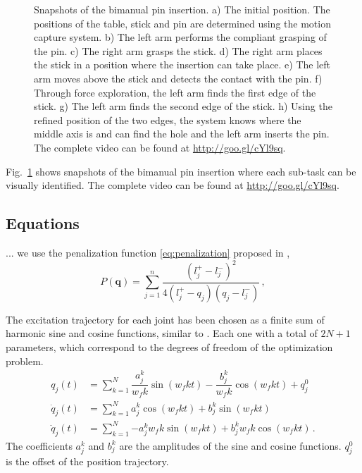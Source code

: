 \documentclass[letterpaper, 10 pt, conference]{ieeeconf}
\newcommand{\fref}[1]{Fig.~\ref{#1}}
\newcommand\vect[1]{\boldsymbol{#1}}
\begin{document}
\begin{figure}[t]
  \caption{Snapshots of the bimanual pin insertion. a) The initial position. The positions of the table, stick and pin are determined using the motion capture system. b) The left arm performs the compliant grasping of the pin. c) The right arm grasps the stick. d) The right arm places the stick in a position where the insertion can take place. e) The left arm moves above the stick and detects the contact with the pin. f) Through force exploration, the left arm finds the first edge of the stick. g) The left arm finds the second edge of the stick. h) Using the refined position of the two edges, the system knows where the middle axis is and can find the hole and the left arm inserts the pin. The complete video can be found at \protect\url{http://goo.gl/cYl9sq}.}
  \label{fig:snapshots}
\end{figure}
\fref{fig:snapshots} shows snapshots of the bimanual pin insertion where each sub-task can be visually identified. The complete video can be found at \url{http://goo.gl/cYl9sq}.

\subsection{Equations}

... we use the penalization function \eqref{eq:penalization} proposed in \cite{Dubey1995},
\begin{equation}
  P(\vect{q}) = \sum_{j=1}^{n}\dfrac{\left( l_{j}^{+} - l_{j}^{-} \right)^{2}}{4 \left( l_{j}^{+} - q_{j} \right)\left( q_{j} - l_{j}^{-} \right)} \, ,
  \label{eq:penalization} 
\end{equation}

The excitation trajectory for each joint has been chosen as a finite sum of harmonic sine and cosine functions, similar to \cite{Swevers2007,Kubus2008}. Each one with a total of $2N + 1$ parameters, which correspond to the degrees of freedom of the optimization problem.
\begin{align}
  q_{j}\left(t\right) &= \sum_{k=1}^{N}{\dfrac{a_{j}^{k}}{w_{f}k}\sin\left( w_{f}kt \right) - \dfrac{b_{j}^{k}}{{w_{f}k}}\cos\left( w_{f}kt \right)} + q_{j}^{0} \\
  \dot{q}_{j}\left(t\right) &= \sum_{k=1}^{N}{a_{j}^{k}\cos\left( w_{f}kt \right) + b_{j}^{k}\sin\left( w_{f}kt \right)} \\
  \ddot{q}_{j}\left(t\right) &= \sum_{k=1}^{N}{-a_{j}^{k}w_{f}k\sin\left( w_{f}kt \right) + b_{j}^{k}w_{f}k\cos\left( w_{f}kt \right)} \, .
\end{align}
The coefficients $a_{j}^{k}$ and $b_{j}^{k}$ are the amplitudes of the sine and cosine functions. $q_{j}^{0}$ is the offset of the position trajectory.



\end{document}
